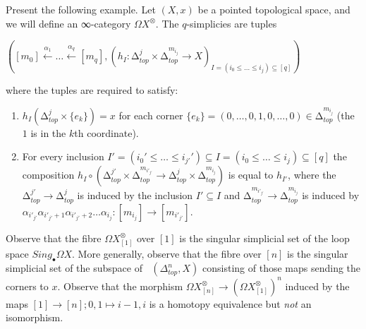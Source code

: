 \documentclass[a4paper]{amsart}
\numberwithin{figure}{section}
\theoremstyle{theorem}
\theoremstyle{definition}
\DeclareMathOperator{\uhom}{\underline{hom}}
\begin{document}


Present the following example. Let $(X, x)$ be a pointed topological space, and we will define an ∞-category $\Omega X^\otimes$. The $q$-simplicies are tuples
\begin{center}
$([m_0] {\stackrel{\alpha_1}{\leftarrow}} \dots {\stackrel{\alpha_q}{\leftarrow}} [m_q], (h_I: ∆_{top}^{j} {\times} ∆_{top}^{m_{i_j}} \to X)_{I = (i_0 ≤ \dots ≤ i_j) \subseteq [q]})$
\end{center}
where the tuples are required to satisfy:
\begin{enumerate}
 \item $h_I(∆_{top}^{j}{\times}\{e_k\}) = x$ for each corner $\{e_k\} = (0, \dots, 0, 1, 0, \dots, 0) \in ∆^{m_{i_j}}_{top}$ (the $1$ is in the $k$th coordinate).
 \item For every inclusion $ I' = (i_0' ≤ \dots ≤ i_{j'}') \subseteq I = (i_0 ≤ \dots ≤ i_{j}) \subseteq [q]$ the composition $h_I \circ (∆_{top}^{j'} {\times} ∆_{top}^{m_{i'_{j'}}} {→} ∆_{top}^{j} {\times} ∆_{top}^{m_{i_j}})$ is equal to $h_{I'}$, where the $∆_{top}^{j'}{→}∆_{top}^{j}$ is induced by the inclusion $I' ⊆ I$ and $∆_{top}^{m_{i'_{j'}}} {→} ∆_{top}^{m_{i_j}}$ is induced by $\alpha_{i'_{j'}} \alpha_{i'_{j'}{+}1} \alpha_{i'_{j'}{+}2} \dots \alpha_{i_j}:[m_{i_j}] {→} [m_{i'_{j'}}]$.
\end{enumerate}
Observe that the fibre $\Omega X^\otimes_{[1]}$ over $[1]$ is the singular simplicial set of the loop space $Sing_\bullet \Omega X$. %
More generally, observe that the fibre over $[n]$ is the singular simplicial set of the subspace of $\uhom(\Delta_{top}^n, X)$ consisting of those maps sending the corners to $x$. %
Observe that the morphism $\Omega X^\otimes_{[n]} \to (\Omega X^\otimes_{[1]})^n$ induced by the maps $[1] {→} [n]; 0,1 \mapsto i{-}1,i$ is a homotopy equivalence but \emph{not} an isomorphism. %
\end{document}
